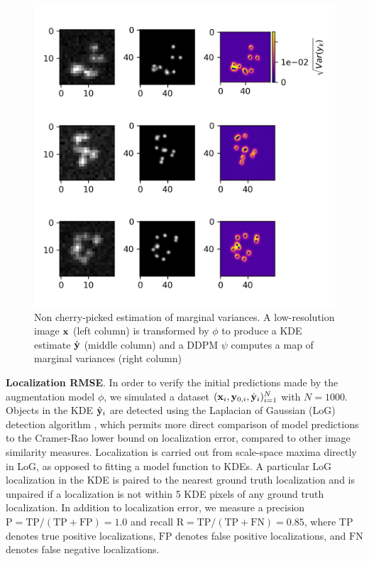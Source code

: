 \documentclass{article}
\begin{document}
\begin{figure}
\centering
\includegraphics[scale=1.1]{media/Bayes.png}
\caption{Non cherry-picked estimation of marginal variances. A low-resolution image $\bold{x}$ (left column) is transformed by $\phi$ to produce a KDE estimate $\hat{\bold{y}}$ (middle column) and a DDPM $\psi$ computes a map of marginal variances (right column)}
\end{figure}

\textbf{Localization RMSE}. In order to verify the initial predictions made by the augmentation model $\phi$, we simulated a dataset $(\bold{x}_i,\bold{y}_{0,i},\hat{\bold{y}}_{i})_{i=1}^{N}$ with $N=1000$. Objects in the KDE $\hat{\bold{y}}_{i}$  are detected using the Laplacian of Gaussian (LoG) detection algorithm \citep{Kong2013}, which permits more direct comparison of model predictions to the Cramer-Rao lower bound on localization error, compared to other image similarity measures. Localization is carried out from scale-space maxima directly in LoG, as opposed to fitting a model function to KDEs. A particular LoG localization in the KDE is paired to the nearest ground truth localization and is unpaired if a localization is not within 5 KDE pixels of any ground truth localization. In addition to localization error, we measure a precision $\mathrm{P = TP/(TP + FP)} = 1.0$ and recall $\mathrm{R = TP/(TP + FN)} = 0.85$, where $\mathrm{TP}$ denotes true positive localizations, $\mathrm{FP}$ denotes false positive localizations, and $\mathrm{FN}$ denotes false negative localizations.
\end{document}
